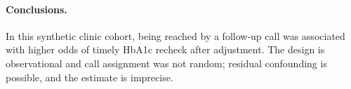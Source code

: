 \documentclass[10pt]{article}
\begin{document}
\paragraph{Conclusions.} In this synthetic clinic cohort, being reached by a follow-up call was associated with higher odds of timely HbA1c recheck after adjustment. The design is observational and call assignment was not random; residual confounding is possible, and the estimate is imprecise.

\setlength{\bibsep}{1pt}\small


\end{document}

